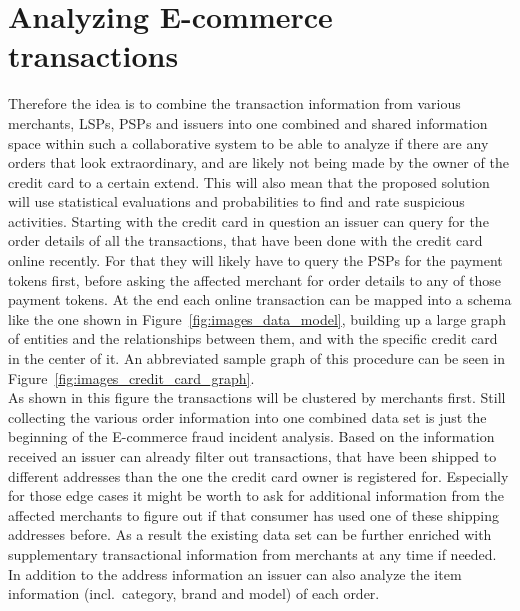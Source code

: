 
\section{Analyzing \gls{E-commerce} transactions}
\label{sec:analyze_transactions}

Therefore the idea is to combine the transaction information from various merchants, \gls{LSP}s, \gls{PSP}s and issuers into one combined and shared information space within such a collaborative system to be able to analyze if there are any orders that look extraordinary, and are likely not being made by the owner of the credit card to a certain extend. This will also mean that the proposed solution will use statistical evaluations and probabilities to find and rate suspicious activities. Starting with the credit card in question an issuer can query for the order details of all the transactions, that have been done with the credit card online recently. For that they will likely have to query the \gls{PSP}s for the payment tokens first, before asking the affected merchant for order details to any of those payment tokens. At the end each online transaction can be mapped into a schema like the one shown in Figure~\ref{fig:images_data_model}, building up a large graph of entities and  the relationships between them, and with the specific credit card in the center of it. An abbreviated sample graph of this procedure can be seen in Figure~\ref{fig:images_credit_card_graph}. \\

As shown in this figure the transactions will be clustered by merchants first. Still collecting the various order information into one combined data set is just the beginning of the \gls{E-commerce} fraud incident analysis. Based on the information received an issuer can already filter out transactions, that have been shipped to different addresses than the one the credit card owner is registered for. Especially for those edge cases it might be worth to ask for additional information from the affected merchants to figure out if that consumer has used one of these shipping addresses before. As a result the existing data set can be further enriched with supplementary transactional information from merchants at any time if needed. In addition to the address information an issuer can also analyze the item information (incl.\ category, brand and model) of each order. \\

